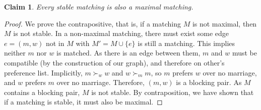 \documentclass[12pt]{article}
\newtheorem*{claim}{Claim}
\begin{document}
\begin{claim}
Every stable matching is also a maximal matching.
\end{claim}
\begin{proof}
We prove the contrapositive, that is, if a matching $M$ is not maximal, then $M$ is not stable. In a non-maximal matching, there must exist some edge $e = (m, w)$ not in $M$ with $M' = M \cup \{e\}$ is still a matching. This implies neither $m$ nor $w$ is matched. As there is an edge between them, $m$ and $w$ must be compatible (by the construction of our graph), and therefore on other's preference list. Implicitly, $m \succ_w w$ and $w \succ_m m$, so $m$ prefers $w$ over no marriage, and $w$ prefers $m$ over no marriage. Therefore, $(m, w)$ is a blocking pair. As $M$ contains a blocking pair, $M$ is not stable. By contraposition, we have shown that if a matching is stable, it must also be maximal.
\end{proof}
\end{document}
